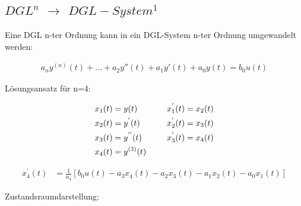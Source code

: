 \documentclass[10pt,a4paper]{article}
\begin{document}
\subsection{$DGL^n$ $\rightarrow$ $DGL-System^1$}
Eine DGL n-ter Ordnung kann in ein DGL-System n-ter Ordnung umgewandelt werden:
  \begin{mdframed}[style=exercise]
    \begin{align}
        a_n y^{(n)}(t) + ... + a_2 y''(t) + a_1 y'(t)+ a_0 y(t)= b_0u(t)
    \end{align}
  \end{mdframed}
Lösungsansatz für n=4: 
  \begin{mdframed}[style=exercise]
    \begin{align}
        x_1(t) &= y(t) & \indent      x_1^{'}(t) &= x_2(t)\\
        x_2(t) &= y^{'}(t) &\indent   x_2^{'}(t) &= x_3(t)\\
        x_3(t) &= y^{''}(t) &\indent  x_3^{'}(t) &= x_4(t)\\
        x_4(t) &= y^{(3)}(t) &\indent 
    \end{align}
  \end{mdframed}
  \begin{mdframed}[style=exercise]
    \begin{align}
        x_4^{'}(t) &= \frac{1}{a_4}[b_0 u(t) -a_3x_4(t) - a_2x_3(t)-a_1x_2(t)-a_0x_1(t)]
    \end{align}
  \end{mdframed}
Zustandsraumdarstellung:
\end{document}
